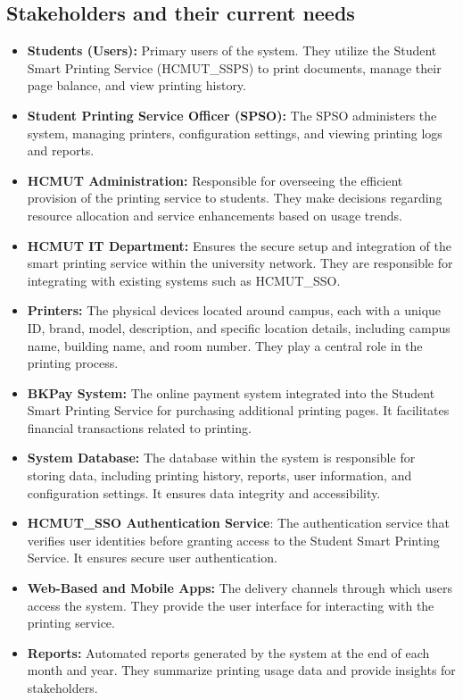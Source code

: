 \subsection{Stakeholders and their current needs}
\begin{itemize}
\item \textbf{Students (Users):} Primary users of the system. They utilize the Student Smart Printing Service (HCMUT\_SSPS) to print documents, manage their page balance, and view printing history.

\item \textbf{Student Printing Service Officer (SPSO):} The SPSO administers the system, managing printers, configuration settings, and viewing printing logs and reports.
\item \textbf{HCMUT Administration:} Responsible for overseeing the efficient provision of the printing service to students. They make decisions regarding resource allocation and service enhancements based on usage trends.

\item \textbf{HCMUT IT Department:} Ensures the secure setup and integration of the smart printing service within the university network. They are responsible for integrating with existing systems such as HCMUT\_SSO.

\item \textbf{Printers:} The physical devices located around campus, each with a unique ID, brand, model, description, and specific location details, including campus name, building name, and room number. They play a central role in the printing process.

\item \textbf{BKPay System:} The online payment system integrated into the Student Smart Printing Service for purchasing additional printing pages. It facilitates financial transactions related to printing.

\item \textbf{System Database:} The database within the system is responsible for storing data, including printing history, reports, user information, and configuration settings. It ensures data integrity and accessibility.

\item \textbf{HCMUT\_SSO Authentication Service}: The authentication service that verifies user identities before granting access to the Student Smart Printing Service. It ensures secure user authentication.

\item \textbf{Web-Based and Mobile Apps:} The delivery channels through which users access the system. They provide the user interface for interacting with the printing service.

\item \textbf{Reports:} Automated reports generated by the system at the end of each month and year. They summarize printing usage data and provide insights for stakeholders.

\end{itemize}

